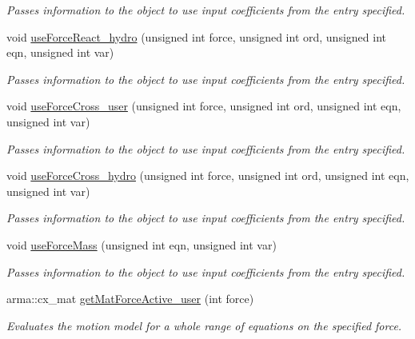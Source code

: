 \begin{DoxyCompactItemize}
\begin{DoxyCompactList}\small\item\em Passes information to the object to use input coefficients from the entry specified. \end{DoxyCompactList}\item 
void \hyperlink{classosea_1_1ofreq_1_1_motion_model_ae3d2c7527ea2daddc6a85b6e02febb45}{use\-Force\-React\-\_\-hydro} (unsigned int force, unsigned int ord, unsigned int eqn, unsigned int var)
\begin{DoxyCompactList}\small\item\em Passes information to the object to use input coefficients from the entry specified. \end{DoxyCompactList}\item 
void \hyperlink{classosea_1_1ofreq_1_1_motion_model_a1159117995080d2b62e50fceaeb29778}{use\-Force\-Cross\-\_\-user} (unsigned int force, unsigned int ord, unsigned int eqn, unsigned int var)
\begin{DoxyCompactList}\small\item\em Passes information to the object to use input coefficients from the entry specified. \end{DoxyCompactList}\item 
void \hyperlink{classosea_1_1ofreq_1_1_motion_model_abfd6e4a22ec23d7ee462adb737fab3f2}{use\-Force\-Cross\-\_\-hydro} (unsigned int force, unsigned int ord, unsigned int eqn, unsigned int var)
\begin{DoxyCompactList}\small\item\em Passes information to the object to use input coefficients from the entry specified. \end{DoxyCompactList}\item 
void \hyperlink{classosea_1_1ofreq_1_1_motion_model_aecaf9f0261355cff2acf602acd728644}{use\-Force\-Mass} (unsigned int eqn, unsigned int var)
\begin{DoxyCompactList}\small\item\em Passes information to the object to use input coefficients from the entry specified. \end{DoxyCompactList}\item 
arma\-::cx\-\_\-mat \hyperlink{classosea_1_1ofreq_1_1_motion_model_af9d30b6afa16093429fab496d18c5d00}{get\-Mat\-Force\-Active\-\_\-user} (int force)
\begin{DoxyCompactList}\small\item\em Evaluates the motion model for a whole range of equations on the specified force. \end{DoxyCompactList}\item 

\end{DoxyCompactItemize}
